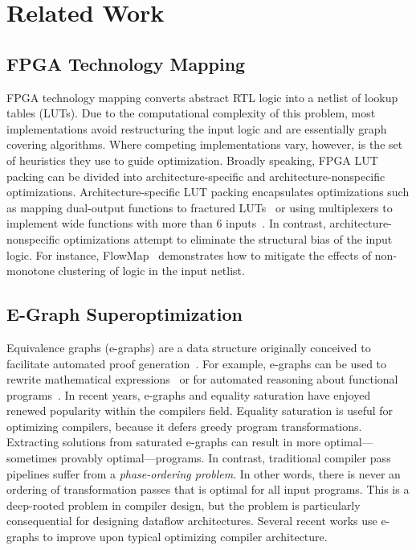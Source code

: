 \section{Related Work}\label{sec:relatedwork}

\subsection{FPGA Technology Mapping}\label{sec:relatedwork:fpga}
FPGA technology mapping converts abstract RTL logic into a netlist of lookup
tables (LUTs). Due to the computational complexity of this problem, most
implementations avoid restructuring the input logic and are essentially graph
covering algorithms. Where competing implementations vary, however, is the set
of heuristics they use to guide optimization. Broadly speaking, FPGA LUT
packing can be divided into architecture-specific and architecture-nonspecific
optimizations. Architecture-specific LUT packing encapsulates optimizations
such as mapping dual-output functions to fractured LUTs~\cite{fraclut} or using
multiplexers to implement wide functions with more than 6 inputs~\cite{ug574}.
In contrast, architecture-nonspecific optimizations attempt to eliminate the
structural bias of the input logic. For instance, FlowMap~\cite{flowmap}
demonstrates how to mitigate the effects of non-monotone clustering of logic in
the input netlist.

\subsection{E-Graph Superoptimization}\label{sec:relatedwork:egraph}
Equivalence graphs (e-graphs) are a data structure originally conceived to
facilitate automated proof generation~\cite{eggpaper, eqsat}. For example,
e-graphs can be used to rewrite mathematical expressions~\cite{egraphmath} or
for automated reasoning about functional programs~\cite{cclemma}. In recent
years, e-graphs and equality saturation have enjoyed renewed popularity within
the compilers field. Equality saturation is useful for optimizing compilers,
because it defers greedy program transformations. Extracting solutions from
saturated e-graphs can result in more optimal---sometimes provably
optimal---programs. In contrast, traditional compiler pass pipelines suffer
from a \textit{phase-ordering problem}. In other words, there is never an
ordering of transformation passes that is optimal for all input programs. This
is a deep-rooted problem in compiler design, but the problem is particularly
consequential for designing dataflow architectures. Several recent works use
e-graphs to improve upon typical optimizing compiler architecture.

